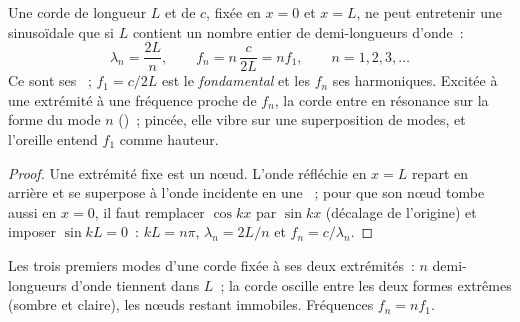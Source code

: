 \begin{proposition}\label{prop:b1:wave-propagation:modes}
Une corde de longueur $L$ et de  $c$, fixée en $x = 0$ et
$x = L$, ne peut entretenir une  sinusoïdale que si
$L$ contient un nombre entier de demi-longueurs d'onde~:
\[
\lambda_n = \frac{2L}{n}, \qquad f_n = n\,\frac{c}{2L} = n f_1,
\qquad n = 1, 2, 3, \dots
\]
Ce sont ses \emph{}~; $f_1 = c/2L$ est le
\emph{fondamental} et les $f_n$ ses harmoniques. Excitée à une extrémité
à une fréquence proche de $f_n$, la corde entre en résonance sur la
forme du mode $n$ ()~; pincée, elle vibre sur une
superposition de modes, et l'oreille entend $f_1$ comme hauteur.
\end{proposition}

\begin{proof}
Une extrémité fixe est un nœud. L'onde réfléchie en $x = L$ repart en
arrière et se superpose à l'onde incidente en une ~;
pour que son nœud tombe aussi en $x = 0$, il faut remplacer $\cos kx$
par $\sin kx$ (décalage de l'origine) et imposer $\sin kL = 0$~:
$kL = n\pi$, $\lambda_n = 2L/n$ et $f_n = c/\lambda_n$.
\end{proof}

\begin{omfigure}

{\small Les trois premiers modes d'une corde fixée à ses deux
extrémités~: $n$ demi-longueurs d'onde tiennent dans $L$~; la corde
oscille entre les deux formes extrêmes (sombre et claire), les nœuds
restant immobiles. Fréquences $f_n = nf_1$.}
\end{omfigure}

